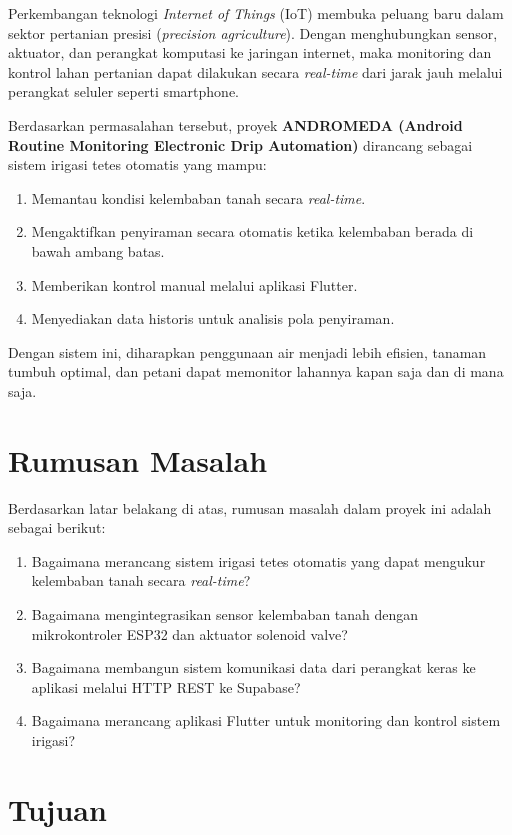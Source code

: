\documentclass[12pt,a4paper,oneside]{report}
\begin{document}
Perkembangan teknologi \textit{Internet of Things} (IoT) membuka peluang baru dalam sektor pertanian presisi (\textit{precision agriculture}). Dengan menghubungkan sensor, aktuator, dan perangkat komputasi ke jaringan internet, maka monitoring dan kontrol lahan pertanian dapat dilakukan secara \textit{real-time} dari jarak jauh melalui perangkat seluler seperti smartphone.

Berdasarkan permasalahan tersebut, proyek \textbf{ANDROMEDA (Android Routine Monitoring Electronic Drip Automation)} dirancang sebagai sistem irigasi tetes otomatis yang mampu:
\begin{enumerate}
    \item Memantau kondisi kelembaban tanah secara \textit{real-time}.
    \item Mengaktifkan penyiraman secara otomatis ketika kelembaban berada di bawah ambang batas.
    \item Memberikan kontrol manual melalui aplikasi Flutter.
    \item Menyediakan data historis untuk analisis pola penyiraman.
\end{enumerate}

Dengan sistem ini, diharapkan penggunaan air menjadi lebih efisien, tanaman tumbuh optimal, dan petani dapat memonitor lahannya kapan saja dan di mana saja.

\section{Rumusan Masalah}

Berdasarkan latar belakang di atas, rumusan masalah dalam proyek ini adalah sebagai berikut:
\begin{enumerate}
    \item Bagaimana merancang sistem irigasi tetes otomatis yang dapat mengukur kelembaban tanah secara \textit{real-time}?
    \item Bagaimana mengintegrasikan sensor kelembaban tanah dengan mikrokontroler ESP32 dan aktuator solenoid valve?
    \item Bagaimana membangun sistem komunikasi data dari perangkat keras ke aplikasi melalui HTTP REST ke Supabase?
    \item Bagaimana merancang aplikasi Flutter untuk monitoring dan kontrol sistem irigasi?
\end{enumerate}

\section{Tujuan}
\end{document}

